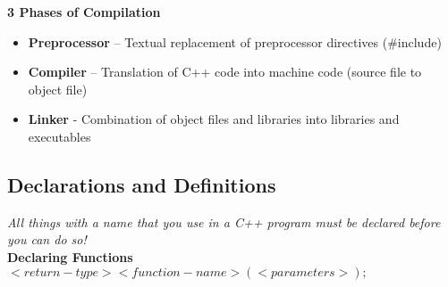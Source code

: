 \textbf{3 Phases of Compilation}
\begin{itemize}
  \itemsep0em 
  \item \textbf{Preprocessor} – Textual replacement of preprocessor directives (\#include)
  \item \textbf{Compiler} – Translation of C++ code into machine code (source file to object file)
  \item \textbf{Linker} - Combination of object files and libraries into libraries and executables
\end{itemize}

\subsection{Declarations and Definitions}
\textit{All things with a name that you use in a C++ program must be declared before you can do so!} \\
\textbf{Declaring Functions} \\
$<return-type> <function-name> (<parameters>);$







